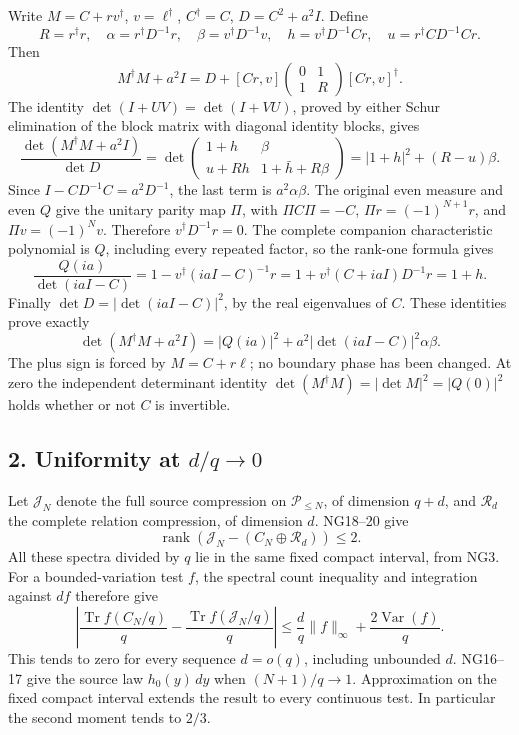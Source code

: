 \documentclass[11pt]{article}
\begin{document}
Write \(M=C+rv^\dagger\), \(v=\ell^\dagger\), \(C^\dagger=C\), \(D=C^2+a^2I\). Define \[
R=r^\dagger r,\quad
\alpha=r^\dagger D^{-1}r,\quad
\beta=v^\dagger D^{-1}v,\quad
h=v^\dagger D^{-1}Cr,\quad
u=r^\dagger CD^{-1}Cr.
\] Then \[
M^\dagger M+a^2I
=D+[Cr,v]\begin{pmatrix}0&1\\1&R\end{pmatrix}[Cr,v]^\dagger.
\] The identity \(\det(I+UV)=\det(I+VU)\), proved by either Schur elimination of the block matrix with diagonal identity blocks, gives \[
\frac{\det(M^\dagger M+a^2I)}{\det D}
=\det\begin{pmatrix}1+h&\beta\\u+Rh&1+\bar h+R\beta\end{pmatrix}
=|1+h|^2+(R-u)\beta.
\] Since \(I-CD^{-1}C=a^2D^{-1}\), the last term is \(a^2\alpha\beta\). The original even measure and even \(Q\) give the unitary parity map \(\Pi\), with \(\Pi C\Pi=-C\), \(\Pi r=(-1)^{N+1}r\), and \(\Pi v=(-1)^Nv\). Therefore \(v^\dagger D^{-1}r=0\). The complete companion characteristic polynomial is \(Q\), including every repeated factor, so the rank-one formula gives \[
\frac{Q(ia)}{\det(iaI-C)}
=1-v^\dagger(iaI-C)^{-1}r
=1+v^\dagger(C+iaI)D^{-1}r=1+h.
\] Finally \(\det D=|\det(iaI-C)|^2\), by the real eigenvalues of \(C\). These identities prove exactly \[
\det(M^\dagger M+a^2I)
=|Q(ia)|^2+a^2|\det(iaI-C)|^2\alpha\beta.
\] The plus sign is forced by \(M=C+r\ell\); no boundary phase has been changed. At zero the independent determinant identity \(\det(M^\dagger M)=|\det M|^2=|Q(0)|^2\) holds whether or not \(C\) is invertible.

\subsection{\texorpdfstring{2. Uniformity at \(d/q\to0\)}{2. Uniformity at d/q\textbackslash to0}}\label{osdind:uniformity-at-dqto0}

Let \(\mathcal J_N\) denote the full source compression on \(\mathcal P_{\le N}\), of dimension \(q+d\), and \(\mathcal R_d\) the complete relation compression, of dimension \(d\). NG18--20 give \[
\operatorname{rank}\!\left(\mathcal J_N-
          (C_N\oplus\mathcal R_d)\right)\le2.
\] All these spectra divided by \(q\) lie in the same fixed compact interval, from NG3. For a bounded-variation test \(f\), the spectral count inequality and integration against \(df\) therefore give \[
\left|\frac{\operatorname{Tr}f(C_N/q)}q
       -\frac{\operatorname{Tr}f(\mathcal J_N/q)}q\right|
\le \frac d q\|f\|_\infty+\frac{2\operatorname{Var}(f)}q.
\] This tends to zero for every sequence \(d=o(q)\), including unbounded \(d\). NG16--17 give the source law \(h_0(y)\,dy\) when \((N+1)/q\to1\). Approximation on the fixed compact interval extends the result to every continuous test. In particular the second moment tends to \(2/3\).
\end{document}
